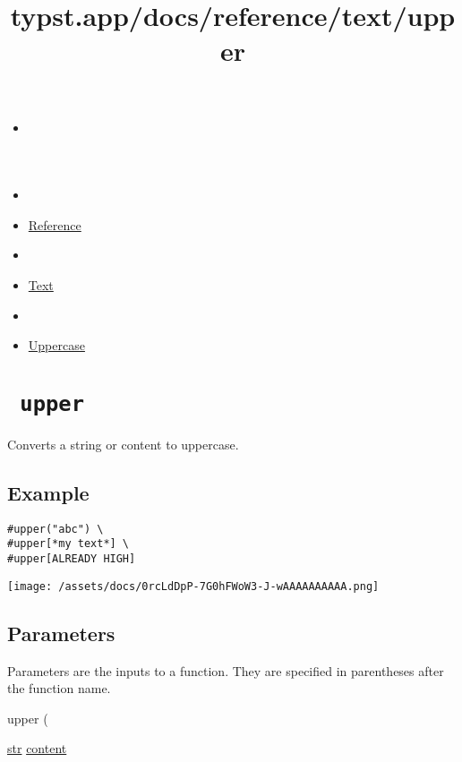 \title{typst.app/docs/reference/text/upper}

\begin{itemize}
\tightlist
\item
  \href{/docs}{}
\item
  
\item
  \href{/docs/reference/}{Reference}
\item
  
\item
  \href{/docs/reference/text/}{Text}
\item
  
\item
  \href{/docs/reference/text/upper/}{Uppercase}
\end{itemize}

\section{\texorpdfstring{\texttt{\ upper\ }}{ upper }}\label{summary}

Converts a string or content to uppercase.

\subsection{Example}\label{example}

\begin{verbatim}
#upper("abc") \
#upper[*my text*] \
#upper[ALREADY HIGH]
\end{verbatim}

\texttt{[image: /assets/docs/0rcLdDpP-7G0hFWoW3-J-wAAAAAAAAAA.png]}

\subsection{\texorpdfstring{{ Parameters
}}{ Parameters }}\label{parameters}

\label{parameters-tooltip}
Parameters are the inputs to a function. They are specified in
parentheses after the function name.

{ upper } (

{ \href{/docs/reference/foundations/str/}{str}
\href{/docs/reference/foundations/content/}{content} }


